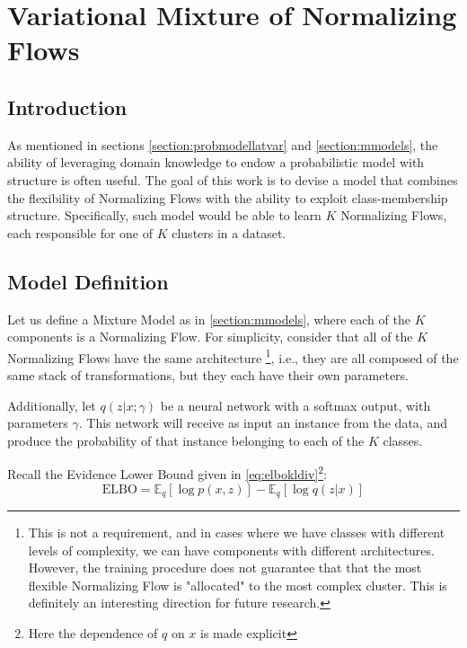 \chapter{Variational Mixture of Normalizing Flows}
\label{chapter:vmonf}

\section{Introduction}
\label{section:vmonf-intro}

As mentioned in sections \ref{section:probmodellatvar} and \ref{section:mmodels},
the ability of leveraging domain knowledge to endow a probabilistic model with
structure is often useful. The goal of this work is to devise a model that combines
the flexibility of Normalizing Flows with the ability to exploit class-membership
structure. Specifically, such model would be able to learn $K$ Normalizing Flows,
each responsible for one of $K$ clusters in a dataset.

\section{Model Definition}

Let us define a Mixture Model as in \ref{section:mmodels}, where each of the $K$
components is a Normalizing Flow. For simplicity, consider that all of the $K$
Normalizing Flows have the same architecture \footnote{This is not a requirement,
and in cases where we have classes with different levels of complexity, we can
have components with different architectures. However, the training procedure
does not guarantee that that the most flexible Normalizing Flow is "allocated"
to the most complex cluster. This is definitely an interesting direction for future
research.}, i.e., they are all composed of the same stack of transformations,
but they each have their own parameters.

Additionally, let $q(z|x;\gamma)$ be a neural network with a softmax output, with
parameters $\gamma$. This network will receive as input an instance from the
data, and produce the probability of that instance belonging to each of the
$K$ classes.

Recall the Evidence Lower Bound given in \ref{eq:elbokldiv}\footnote{Here the
dependence of $q$ on $x$ is made explicit}:
\begin{equation*}
    \text{ELBO} = \mathbb{E}_q [\log p(x, z)] - \mathbb{E}_q [\log q(z|x)]
\end{equation*}

